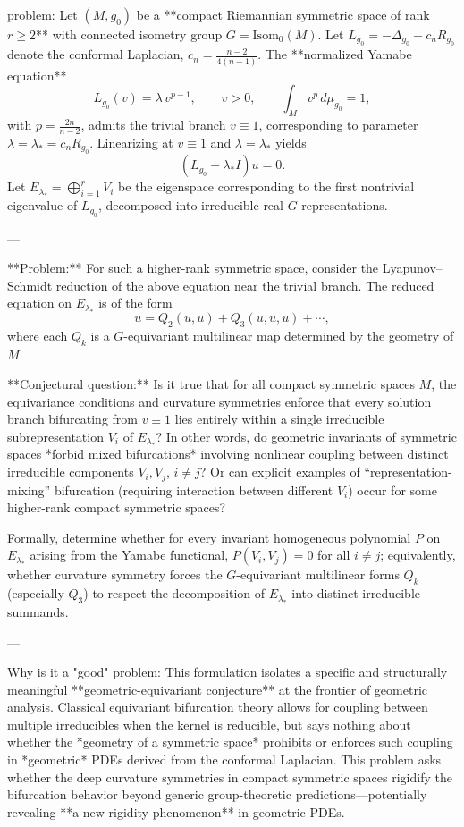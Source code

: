 problem:  
Let \( (M,g_0) \) be a **compact Riemannian symmetric space of rank \( r \ge 2 \)** with connected isometry group \(G = \mathrm{Isom}_0(M)\).  
Let \(L_{g_0} = -\Delta_{g_0} + c_n R_{g_0}\) denote the conformal Laplacian, \(c_n = \frac{n-2}{4(n-1)}\).  
The **normalized Yamabe equation**
\[
L_{g_0}(v) = \lambda\, v^{p-1}, \qquad v>0, \qquad \int_M v^p\, d\mu_{g_0} = 1,
\]
with \(p=\frac{2n}{n-2}\), admits the trivial branch \(v\equiv 1\), corresponding to parameter \(\lambda = \lambda_* = c_n R_{g_0}\).  
Linearizing at \(v \equiv 1\) and \(\lambda = \lambda_*\) yields  
\[
(L_{g_0} - \lambda_* I)u = 0.
\]  
Let \(E_{\lambda_*} = \bigoplus_{i=1}^r V_i\) be the eigenspace corresponding to the first nontrivial eigenvalue of \(L_{g_0}\), decomposed into irreducible real \(G\)-representations.

---

**Problem:**  
For such a higher-rank symmetric space, consider the Lyapunov–Schmidt reduction of the above equation near the trivial branch.  
The reduced equation on \(E_{\lambda_*}\) is of the form  
\[
u = Q_2(u,u) + Q_3(u,u,u) + \cdots,
\]
where each \(Q_k\) is a \(G\)-equivariant multilinear map determined by the geometry of \(M\).  

**Conjectural question:**  
Is it true that for all compact symmetric spaces \(M\), the equivariance conditions and curvature symmetries enforce that every solution branch bifurcating from \(v \equiv 1\) lies entirely within a single irreducible subrepresentation \(V_i\) of \(E_{\lambda_*}\)?  
In other words, do geometric invariants of symmetric spaces *forbid mixed bifurcations* involving nonlinear coupling between distinct irreducible components \(V_i, V_j\), \(i \neq j\)?  
Or can explicit examples of “representation-mixing” bifurcation (requiring interaction between different \(V_i\)) occur for some higher-rank compact symmetric spaces?

Formally, determine whether for every invariant homogeneous polynomial \(P\) on \(E_{\lambda_*}\) arising from the Yamabe functional, \(P(V_i,V_j)=0\) for all \(i\neq j\); equivalently, whether curvature symmetry forces the \(G\)-equivariant multilinear forms \(Q_k\) (especially \(Q_3\)) to respect the decomposition of \(E_{\lambda_*}\) into distinct irreducible summands.

---

Why is it a "good" problem:  
This formulation isolates a specific and structurally meaningful **geometric-equivariant conjecture** at the frontier of geometric analysis.  
Classical equivariant bifurcation theory allows for coupling between multiple irreducibles when the kernel is reducible, but says nothing about whether the *geometry of a symmetric space* prohibits or enforces such coupling in *geometric* PDEs derived from the conformal Laplacian.  
This problem asks whether the deep curvature symmetries in compact symmetric spaces rigidify the bifurcation behavior beyond generic group-theoretic predictions—potentially revealing **a new rigidity phenomenon** in geometric PDEs.  


